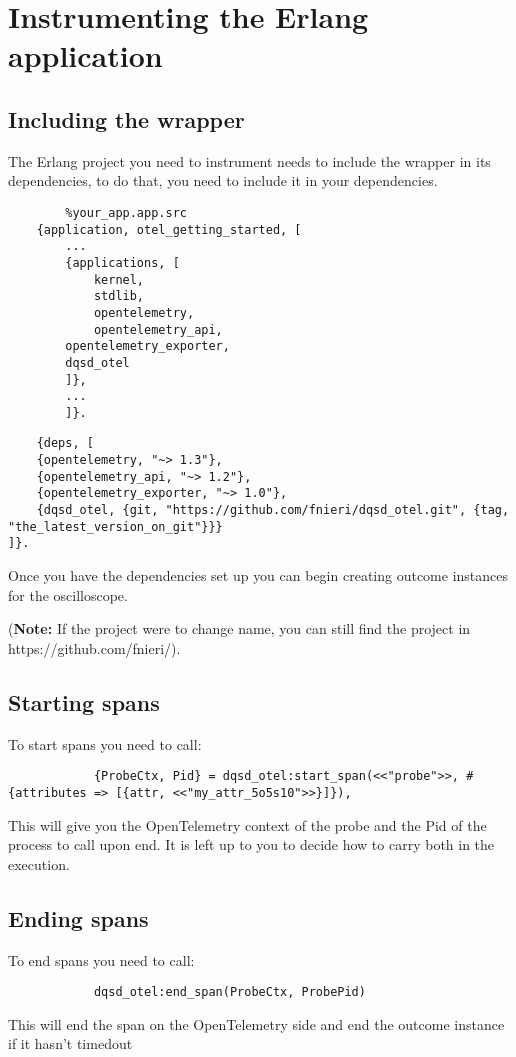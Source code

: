 \section{Instrumenting the Erlang application}
    \subsection{Including the wrapper}

    The Erlang project you need to instrument needs to include the wrapper in its dependencies, to do that, you need to include it in your dependencies.

    \begin{verbatim}
        %your_app.app.src
    {application, otel_getting_started, [
        ...
        {applications, [
            kernel,
            stdlib,
            opentelemetry,
            opentelemetry_api,
        opentelemetry_exporter,
        dqsd_otel
        ]},
        ...
        ]}.
    \end{verbatim}

    \begin{verbatim}
    {deps, [
    {opentelemetry, "~> 1.3"},
    {opentelemetry_api, "~> 1.2"},
    {opentelemetry_exporter, "~> 1.0"},
    {dqsd_otel, {git, "https://github.com/fnieri/dqsd_otel.git", {tag, "the_latest_version_on_git"}}}
]}.
    \end{verbatim}
    
    Once you have the dependencies set up you can begin creating outcome instances for the oscilloscope.

    (\textbf{Note:} If the project were to change name, you can still find the project in https://github.com/fnieri/).

    \subsection{Starting spans}
        To start spans you need to call:
        \begin{verbatim}
            {ProbeCtx, Pid} = dqsd_otel:start_span(<<"probe">>, #{attributes => [{attr, <<"my_attr_5o5s10">>}]}),
        \end{verbatim}
        This will give you the OpenTelemetry context of the probe and the Pid of the process to call upon end. It is left up to you to decide how to carry both in the execution.

    \subsection{Ending spans}
        To end spans you need to call:
        \begin{verbatim}
            dqsd_otel:end_span(ProbeCtx, ProbePid)
        \end{verbatim}
        This will end the span on the OpenTelemetry side and end the outcome instance if it hasn't timedout

